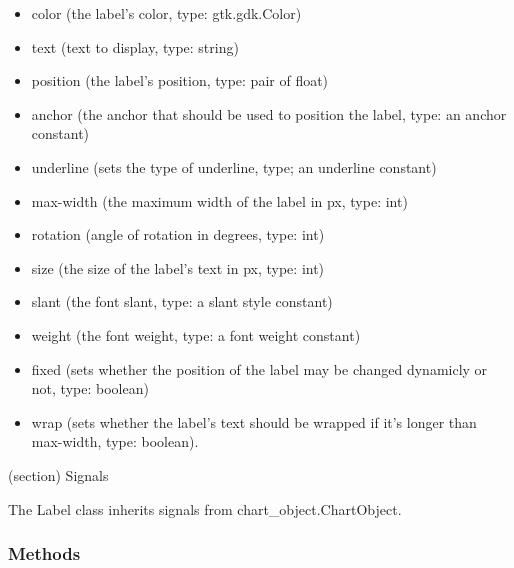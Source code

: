   \begin{itemize}
  \setlength{\parskip}{0.6ex}
    \item color (the label's color, type: gtk.gdk.Color)

    \item text (text to display, type: string)

    \item position (the label's position, type: pair of float)

    \item anchor (the anchor that should be used to position the label, type: 
      an anchor constant)

    \item underline (sets the type of underline, type; an underline constant)

    \item max-width (the maximum width of the label in px, type: int)

    \item rotation (angle of rotation in degrees, type: int)

    \item size (the size of the label's text in px, type: int)

    \item slant (the font slant, type: a slant style constant)

    \item weight (the font weight, type: a font weight constant)

    \item fixed (sets whether the position of the label may be changed 
      dynamicly or not, type: boolean)

    \item wrap (sets whether the label's text should be wrapped if it's longer 
      than max-width, type: boolean).

  \end{itemize}

(section) Signals

  The Label class inherits signals from chart\_object.ChartObject.



  \subsubsection{Methods}

